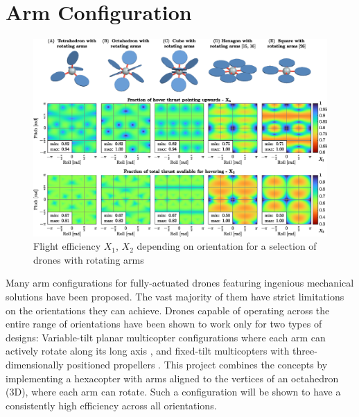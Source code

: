 \documentclass[conference]{IEEEtran}
\begin{document}
\section{Arm Configuration}
\begin{figure}[t!]
	\includegraphics[width=\textwidth]{img/1_geometry_analysis1.eps}
	\centering
	\caption{Flight efficiency $X_1$, $X_2$ depending on orientation for a selection of drones with rotating arms}
	\label{fig:1_geometry_analysis1}
	\vspace{-4pt}
\end{figure}
Many arm configurations for fully-actuated drones featuring ingenious mechanical solutions have been proposed. The vast majority of them \cite{2022_flores_tiltedhex, 2021_ma_ams, 2019_rashad_hamiltonian_control, 2018_tognon_heptw, 2017_florentin_quad4hor, 2017_lei_cohexcd, 2013_jiang_hexc, 2023_cuniatro_voliro2, 2021_buzzatto_unicopter, 2020_xu_bicopter, 2020_lee_t3multirotor, 2020_zheng_tiltdrone, 2016_ryll_fasthex, 2016_odelga_quadvcdc} have strict limitations on the orientations they can achieve. Drones capable of operating across the entire range of orientations have been shown to work only for two types of designs: Variable-tilt planar multicopter configurations where each arm can actively rotate along its long axis \cite{2019_bodie_omav, 2018_kamel_voliro}, and fixed-tilt multicopters with three-dimensionally positioned propellers \cite{2023_howard_lynchpin, 2016_brescianini_octcu, 2018_park_odar, 2020_hamadi_o7plus}. This project combines the concepts by implementing a hexacopter with arms aligned to the vertices of an octahedron (3D), where each arm can rotate. Such a configuration will be shown to have a consistently high efficiency across all orientations.
\end{document}
